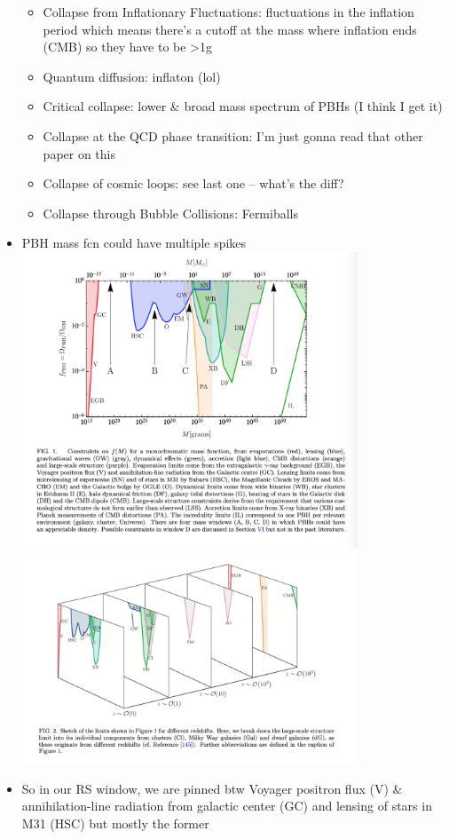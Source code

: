\documentclass[12pt]{article}
\begin{document}
\begin{itemize}
\begin{itemize}
        \item Collapse from Inflationary Fluctuations: fluctuations in the inflation period which means there's a cutoff at the mass where inflation ends (CMB) so they have to be >1g
        \item Quantum diffusion: inflaton (lol)
        \item Critical collapse: lower \& broad mass spectrum of PBHs (I think I get it)
        \item Collapse at the QCD phase transition: I'm just gonna read that other paper on this
        \item Collapse of cosmic loops: see last one -- what's the diff?
        \item Collapse through Bubble Collisions: Fermiballs
    \end{itemize}
    \item PBH mass fcn could have multiple spikes\\
    \includegraphics[width=10cm]{Contraints.png}\\
    \includegraphics[width=10cm]{ConstraintsWrtRS.png}
    \item So in our RS window, we are pinned btw Voyager positron flux (V) \& annihilation-line radiation from galactic center (GC) and lensing of stars in M31 (HSC) but mostly the former

\end{itemize}
\end{document}
